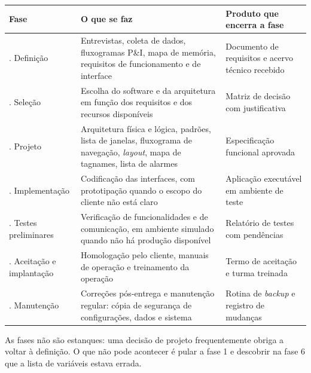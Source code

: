 \begin{longtable}[]{@{}
  >{\raggedright\arraybackslash}p{}
  >{\raggedright\arraybackslash}p{}
  >{\raggedright\arraybackslash}p{}@{}}
\toprule\noalign{}
\begin{minipage}[b]{\linewidth}\raggedright
Fase
\end{minipage} & \begin{minipage}[b]{\linewidth}\raggedright
O que se faz
\end{minipage} & \begin{minipage}[b]{\linewidth}\raggedright
Produto que encerra a fase
\end{minipage} \\
\midrule\noalign{}
\endhead
\bottomrule\noalign{}
\endlastfoot
1. Definição & Entrevistas, coleta de dados, fluxogramas P\&I, mapa de memória, requisitos de funcionamento e de interface & Documento de requisitos e acervo técnico recebido \\
2. Seleção & Escolha do software e da arquitetura em função dos requisitos e dos recursos disponíveis & Matriz de decisão com justificativa \\
3. Projeto & Arquitetura física e lógica, padrões, lista de janelas, fluxograma de navegação, \emph{layout}, mapa de tagnames, lista de alarmes & Especificação funcional aprovada \\
4. Implementação & Codificação das interfaces, com prototipação quando o escopo do cliente não está claro & Aplicação executável em ambiente de teste \\
5. Testes preliminares & Verificação de funcionalidades e de comunicação, em ambiente simulado quando não há produção disponível & Relatório de testes com pendências \\
6. Aceitação e implantação & Homologação pelo cliente, manuais de operação e treinamento da operação & Termo de aceitação e turma treinada \\
7. Manutenção & Correções pós-entrega e manutenção regular: cópia de segurança de configurações, dados e sistema & Rotina de \emph{backup} e registro de mudanças \\
\end{longtable}

As fases não são estanques: uma decisão de projeto frequentemente obriga a voltar à definição. O que
não pode acontecer é pular a fase 1 e descobrir na fase 6 que a lista de variáveis estava errada.

